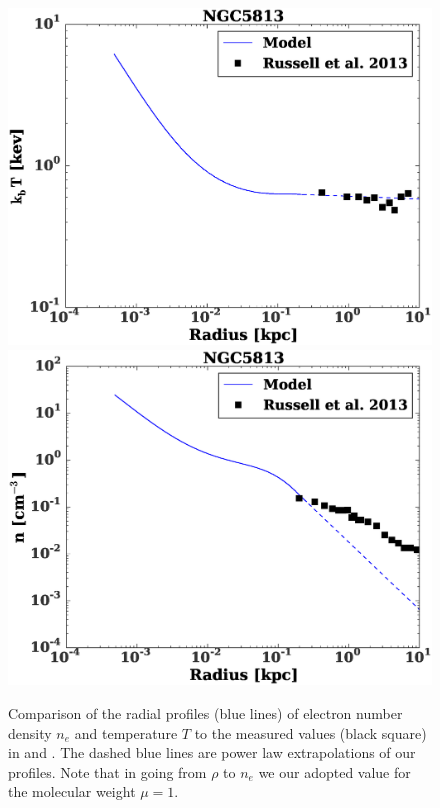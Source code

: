 \documentclass[usenatbib,fleqn]{mn2e}
\begin{document}
\begin{figure}
  \includegraphics[width=\columnwidth]{NGC5813_T.eps}
  \includegraphics[width=\columnwidth]{NGC5813_rho.eps}
  \caption{\label{fig:allen_compare} Comparison of the radial profiles
    (blue lines) of electron number density $n_e$ and temperature $T$
    to the measured values (black square) in \citet{AllenDunn+:2006a}
    and \citet{ RussellMcNamara+:2013a}. The dashed blue lines are
    power law extrapolations of our profiles. Note that in going from
    $\rho$ to $n_e$ we our adopted value for the molecular weight $\mu=1$.}
\end{figure}
\end{document}
